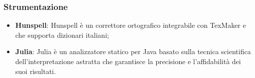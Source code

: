 	\subsubsection{Strumentazione}

		\begin{itemize}
			\item \textbf{Hunspell}:
				Hunspell è un correttore ortografico integrabile con TexMaker e che supporta dizionari italiani;
			\item \textbf{Julia}:
				Julia è un analizzatore statico per Java basato sulla tecnica scientifica dell'interpretazione astratta che garantisce la precisione e l'affidabilità dei suoi risultati.
		\end{itemize}
